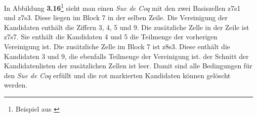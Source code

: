 In Abbildung \textbf{3.16}\footnote{Beispiel aus \cite{HDKSue}} sieht man einen \textit{Sue de Coq} mit den zwei Basiszellen z7s1 und z7s3. Diese liegen im Block 7 in der selben Zeile. Die Vereinigung der Kandidaten enthält die Ziffern 3, 4, 5 und 9. Die zusätzliche Zelle in der Zeile ist z7s7. Sie enthält die Kandidaten 4 und 5 die Teilmenge der vorherigen Vereinigung ist. Die zusätzliche Zelle im Block 7 ist z8s3. Diese enthält die Kandidaten 3 und 9, die ebenfalls Teilmenge der Vereinigung ist. der Schnitt der Kandidatenlisten der zusätzlichen Zellen ist leer. Damit sind alle Bedingungen für den \textit{Sue de Coq} erfüllt und die rot markierten Kandidaten können gelöscht werden.